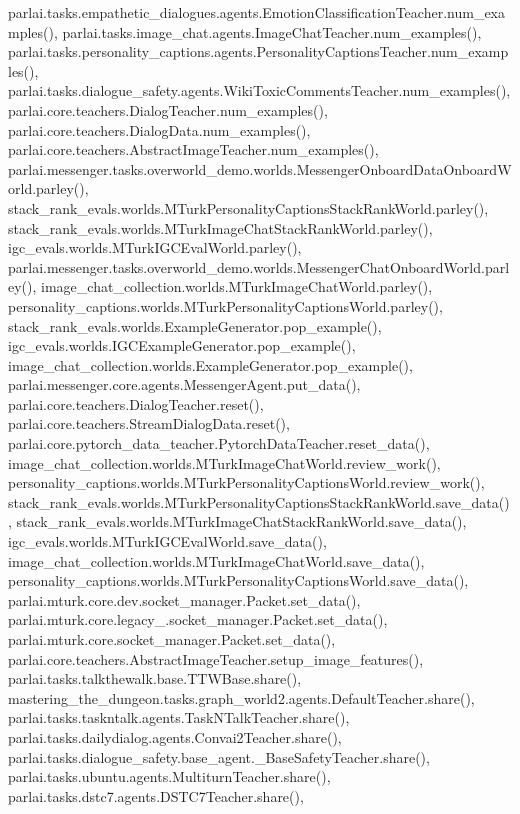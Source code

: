parlai.\+tasks.\+empathetic\+\_\+dialogues.\+agents.\+Emotion\+Classification\+Teacher.\+num\+\_\+examples(), parlai.\+tasks.\+image\+\_\+chat.\+agents.\+Image\+Chat\+Teacher.\+num\+\_\+examples(), parlai.\+tasks.\+personality\+\_\+captions.\+agents.\+Personality\+Captions\+Teacher.\+num\+\_\+examples(), parlai.\+tasks.\+dialogue\+\_\+safety.\+agents.\+Wiki\+Toxic\+Comments\+Teacher.\+num\+\_\+examples(), parlai.\+core.\+teachers.\+Dialog\+Teacher.\+num\+\_\+examples(), parlai.\+core.\+teachers.\+Dialog\+Data.\+num\+\_\+examples(), parlai.\+core.\+teachers.\+Abstract\+Image\+Teacher.\+num\+\_\+examples(), parlai.\+messenger.\+tasks.\+overworld\+\_\+demo.\+worlds.\+Messenger\+Onboard\+Data\+Onboard\+World.\+parley(), stack\+\_\+rank\+\_\+evals.\+worlds.\+M\+Turk\+Personality\+Captions\+Stack\+Rank\+World.\+parley(), stack\+\_\+rank\+\_\+evals.\+worlds.\+M\+Turk\+Image\+Chat\+Stack\+Rank\+World.\+parley(), igc\+\_\+evals.\+worlds.\+M\+Turk\+I\+G\+C\+Eval\+World.\+parley(), parlai.\+messenger.\+tasks.\+overworld\+\_\+demo.\+worlds.\+Messenger\+Chat\+Onboard\+World.\+parley(), image\+\_\+chat\+\_\+collection.\+worlds.\+M\+Turk\+Image\+Chat\+World.\+parley(), personality\+\_\+captions.\+worlds.\+M\+Turk\+Personality\+Captions\+World.\+parley(), stack\+\_\+rank\+\_\+evals.\+worlds.\+Example\+Generator.\+pop\+\_\+example(), igc\+\_\+evals.\+worlds.\+I\+G\+C\+Example\+Generator.\+pop\+\_\+example(), image\+\_\+chat\+\_\+collection.\+worlds.\+Example\+Generator.\+pop\+\_\+example(), parlai.\+messenger.\+core.\+agents.\+Messenger\+Agent.\+put\+\_\+data(), parlai.\+core.\+teachers.\+Dialog\+Teacher.\+reset(), parlai.\+core.\+teachers.\+Stream\+Dialog\+Data.\+reset(), parlai.\+core.\+pytorch\+\_\+data\+\_\+teacher.\+Pytorch\+Data\+Teacher.\+reset\+\_\+data(), image\+\_\+chat\+\_\+collection.\+worlds.\+M\+Turk\+Image\+Chat\+World.\+review\+\_\+work(), personality\+\_\+captions.\+worlds.\+M\+Turk\+Personality\+Captions\+World.\+review\+\_\+work(), stack\+\_\+rank\+\_\+evals.\+worlds.\+M\+Turk\+Personality\+Captions\+Stack\+Rank\+World.\+save\+\_\+data(), stack\+\_\+rank\+\_\+evals.\+worlds.\+M\+Turk\+Image\+Chat\+Stack\+Rank\+World.\+save\+\_\+data(), igc\+\_\+evals.\+worlds.\+M\+Turk\+I\+G\+C\+Eval\+World.\+save\+\_\+data(), image\+\_\+chat\+\_\+collection.\+worlds.\+M\+Turk\+Image\+Chat\+World.\+save\+\_\+data(), personality\+\_\+captions.\+worlds.\+M\+Turk\+Personality\+Captions\+World.\+save\+\_\+data(), parlai.\+mturk.\+core.\+dev.\+socket\+\_\+manager.\+Packet.\+set\+\_\+data(), parlai.\+mturk.\+core.\+legacy\+\_.\+socket\+\_\+manager.\+Packet.\+set\+\_\+data(), parlai.\+mturk.\+core.\+socket\+\_\+manager.\+Packet.\+set\+\_\+data(), parlai.\+core.\+teachers.\+Abstract\+Image\+Teacher.\+setup\+\_\+image\+\_\+features(), parlai.\+tasks.\+talkthewalk.\+base.\+T\+T\+W\+Base.\+share(), mastering\+\_\+the\+\_\+dungeon.\+tasks.\+graph\+\_\+world2.\+agents.\+Default\+Teacher.\+share(), parlai.\+tasks.\+taskntalk.\+agents.\+Task\+N\+Talk\+Teacher.\+share(), parlai.\+tasks.\+dailydialog.\+agents.\+Convai2\+Teacher.\+share(), parlai.\+tasks.\+dialogue\+\_\+safety.\+base\+\_\+agent.\+\_\+\+Base\+Safety\+Teacher.\+share(), parlai.\+tasks.\+ubuntu.\+agents.\+Multiturn\+Teacher.\+share(), parlai.\+tasks.\+dstc7.\+agents.\+D\+S\+T\+C7\+Teacher.\+share(), 